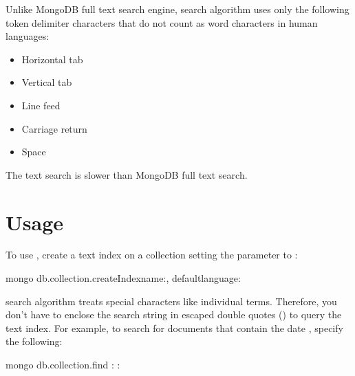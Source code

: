 \documentclass[letterpaper,10pt,english]{sphinxmanual}
\begin{document}
\sphinxAtStartPar
Unlike MongoDB full text search engine,  search algorithm uses only the following token delimiter
characters that do not count as word characters in human languages:
\begin{itemize}
\item {} 
\sphinxAtStartPar
Horizontal tab

\item {} 
\sphinxAtStartPar
Vertical tab

\item {} 
\sphinxAtStartPar
Line feed

\item {} 
\sphinxAtStartPar
Carriage return

\item {} 
\sphinxAtStartPar
Space

\end{itemize}

\sphinxAtStartPar
The  text search is slower than MongoDB full text search.


\section{Usage}
\label{\detokenize{ngram-full-text-search:usage}}
\sphinxAtStartPar
To use , create a text index on
a collection setting the  parameter to :

\begin{sphinxVerbatim}[commandchars=\\\{\}]
mongo \PYGZgt{} db.collection.createIndexname:, default\PYGZus{}language: 
\end{sphinxVerbatim}

\sphinxAtStartPar
{} search algorithm treats special characters like individual terms. Therefore, you don’t have to enclose the search string in escaped double quotes () to query the text index. For example, to search for documents that contain the date , specify the following:

\begin{sphinxVerbatim}[commandchars=\\\{\}]
mongo \PYGZgt{} db.collection.find :  :   
\end{sphinxVerbatim}
\end{document}
